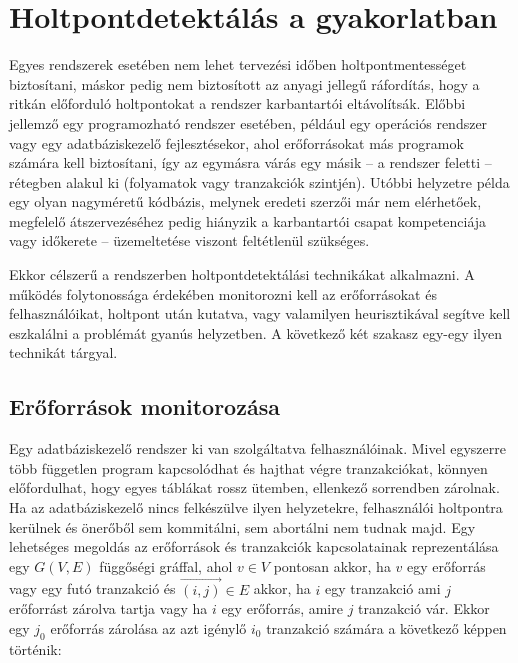 \section{Holtpontdetektálás a gyakorlatban} 
\label{sec:dl-avoiding}

Egyes rendszerek esetében nem lehet tervezési időben holtpontmentességet biztosítani, máskor pedig nem biztosított az anyagi jellegű ráfordítás, hogy a ritkán előforduló holtpontokat a rendszer karbantartói eltávolítsák. Előbbi jellemző egy programozható rendszer esetében, például egy operációs rendszer vagy egy adatbáziskezelő fejlesztésekor, ahol erőforrásokat más programok számára kell biztosítani, így az egymásra várás egy másik -- a rendszer feletti -- rétegben alakul ki (folyamatok vagy tranzakciók szintjén). Utóbbi helyzetre példa egy olyan nagyméretű kódbázis, melynek eredeti szerzői már nem elérhetőek, megfelelő átszervezéséhez pedig hiányzik a karbantartói csapat kompetenciája vagy időkerete -- üzemeltetése viszont feltétlenül szükséges.

    Ekkor célszerű a rendszerben holtpontdetektálási technikákat alkalmazni. A működés folytonossága érdekében monitorozni kell az erőforrásokat és felhasználóikat, holtpont után kutatva, vagy valamilyen heurisztikával segítve kell eszkalálni a problémát gyanús helyzetben. A következő két szakasz egy-egy ilyen technikát tárgyal.

    \subsection{Erőforrások monitorozása} 
    Egy adatbáziskezelő rendszer ki van szolgáltatva felhasználóinak. Mivel egyszerre több független program kapcsolódhat és hajthat végre tranzakciókat, könnyen előfordulhat, hogy egyes táblákat rossz ütemben, ellenkező sorrendben zárolnak. Ha az adatbáziskezelő nincs felkészülve ilyen helyzetekre, felhasználói holtpontra kerülnek és önerőből sem kommitálni, sem abortálni nem tudnak majd. Egy lehetséges megoldás az erőforrások és tranzakciók kapcsolatainak reprezentálása egy $G(V, E)$ függőségi gráffal, ahol $v \in V$  pontosan akkor, ha $v$ egy erőforrás vagy egy futó tranzakció és $\overrightarrow{(i, j)} \in E$ akkor, ha $i$ egy tranzakció ami $j$ erőforrást zárolva tartja vagy ha $i$ egy erőforrás, amire $j$ tranzakció vár. Ekkor egy $j_0$ erőforrás zárolása az azt igénylő $i_0$ tranzakció számára a következő képpen történik:
    
